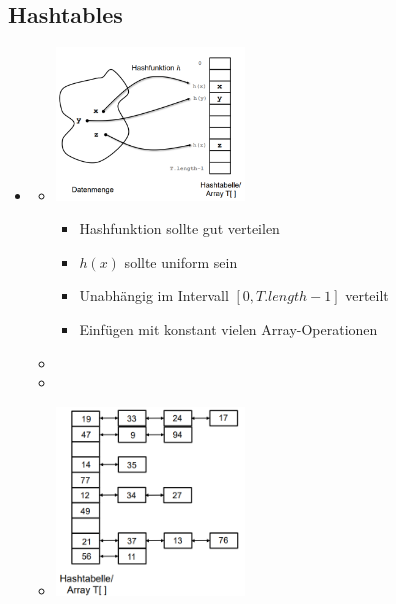 \documentclass[
    12pt,
    a4paper,
    ngerman,
    color=3b,%
    marginpar=false,
    colorback=false,
    leqno,
]{tudaexercise}
\begin{document}
\subsection{Hashtables}\label{Hashtables}
    \begin{itemize}
        \item {}
            \begin{itemize}
                \item[]
                    \begin{minipage}{0.4\textwidth}
                        \includegraphics[width=5cm]{pictures/hashtableIdee.PNG}
                    \end{minipage}
                    \begin{minipage}{0.5\textwidth}
                        \begin{itemize}
                            \item Hashfunktion sollte gut verteilen
                            \item $h(x)$ sollte uniform sein
                            \item Unabhängig im Intervall $[0, T.length-1]$ verteilt
                            \item Einfügen mit konstant vielen Array-Operationen
                        \end{itemize}
                    \end{minipage}
                \item[]
                \item[]
                \item[]
                    \begin{minipage}{0.4\textwidth}
                        \includegraphics[width=5cm]{pictures/hashtableLinkedList.PNG}

\end{minipage}
\end{itemize}
\end{itemize}
\end{document}

